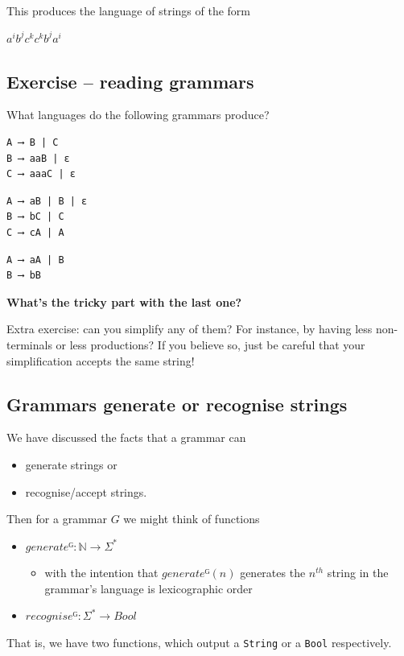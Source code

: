 \documentclass[11pt]{article}
\theoremstyle{definition}
\begin{document}
This produces the language of strings of
the form
\begin{center}
\(a^{i}b^{j}c^{k}c^{k}b^{j}a^{i}\)
\end{center}

\subsection{Exercise – reading grammars}
\label{sec:org2010c84}
What languages do the following grammars produce?

\begin{verbatim}
A ⟶ B | C
B ⟶ aaB | ε
C ⟶ aaaC | ε
\end{verbatim}

\begin{verbatim}
A ⟶ aB | B | ε
B ⟶ bC | C
C ⟶ cA | A
\end{verbatim}

\begin{verbatim}
A ⟶ aA | B
B ⟶ bB
\end{verbatim}

\textbf{What's the tricky part with the last one?}

Extra exercise: can you simplify any of them?
For instance, by having less non-terminals or less productions?
If you believe so, just be careful that
your simplification accepts the same string!

\subsection{Grammars generate or recognise strings}
\label{sec:orga952ca3}
We have discussed the facts that a grammar can
\begin{itemize}
\item generate strings or
\item recognise/accept strings.
\end{itemize}

Then for a grammar \(G\) we might think of functions
\begin{itemize}
\item \(generateᴳ : ℕ → Σ^{*}\)
\begin{itemize}
\item with the intention that \(generateᴳ(n)\) generates the \(n^{th}\)
string in the grammar's language is lexicographic order
\end{itemize}
\item \(recogniseᴳ : Σ^{*} → Bool\)
\end{itemize}
That is, we have two functions, which output a \texttt{String} or
a \texttt{Bool} respectively.
\end{document}
